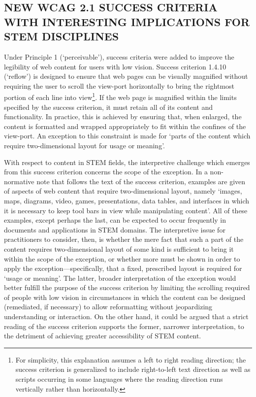 \documentclass[11.5pt]{sig-alternate} %
\begin{document}
\begin{large}
\section*{NEW WCAG 2.1 SUCCESS CRITERIA WITH INTERESTING IMPLICATIONS FOR STEM DISCIPLINES}

Under Principle 1 (‘perceivable’), success criteria were added to improve the legibility of web content for users with low vision. Success criterion 1.4.10 (‘reflow’) is designed to ensure that web pages can be visually magnified without requiring the user to scroll the view-port horizontally to bring the rightmost portion of each line into view\footnote{For simplicity, this explanation assumes a left to right reading direction; the success criterion is generalized to include right-to-left text direction as well as scripts occurring in some languages where the reading direction runs vertically rather than horizontally.}.  If the web page is magnified within the limits specified by the success criterion, it must retain all of its content and functionality. In practice, this is achieved by ensuring that, when enlarged, the content is formatted and wrapped appropriately to fit within the confines of the view-port. An exception to this constraint is made for ‘parts of the content which require two-dimensional layout for usage or meaning’.

With respect to content in STEM fields, the interpretive challenge which emerges from this success criterion concerns the scope of the exception. In a non-normative note that follows the text of the success criterion, examples are given of aspects of web content that require two-dimensional layout, namely ‘images, maps, diagrams, video, games, presentations, data tables, and interfaces in which it is necessary to keep tool bars in view while manipulating content’. All of these examples, except perhaps the last, can be expected to occur frequently in documents and applications in STEM domains. The interpretive issue for practitioners to consider, then, is whether the mere fact that such a part of the content requires two-dimensional layout of some kind is sufficient to bring it within the scope of the exception, or whether more must be shown in order to apply the exception—specifically, that a fixed, prescribed layout is required for ‘usage or meaning’. The latter, broader interpretation of the exception would better fulfill the purpose of the success criterion by limiting the scrolling required of people with low vision in circumstances in which the content can be designed (remediated, if necessary) to allow reformatting without jeopardizing understanding or interaction. On the other hand, it could be argued that a strict reading of the success criterion supports the former, narrower interpretation, to the detriment of achieving greater accessibility of STEM content.


\end{large}
\end{document}
